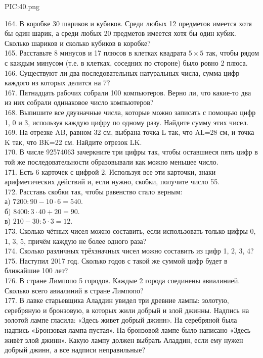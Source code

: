 \begin{center}
{{PIC:40.png}}
\end{center}
164. В коробке 30 шариков и кубиков. Среди любых 12 предметов имеется хотя бы один шарик, а среди любых 20 предметов имеется хотя бы один кубик. Сколько шариков и сколько кубиков в коробке?\\
165. Расставьте 8 минусов и 17 плюсов в клетках квадрата $5\times5$ так, чтобы рядом с каждым минусом (т.е. в клетках, соседних по стороне) было ровно 2 плюса.\\
166. Существуют ли два последовательных натуральных числа, сумма цифр каждого из которых делится на 7?\\
167. Пятнадцать рабочих собрали 100 компьютеров. Верно ли, что какие-то два из них собрали одинаковое число компьютеров?\\
168. Выпишите все двузначные числа, которые можно записать с помощью цифр 1, 0 и 3, используя каждую цифру по одному разу. Найдите сумму этих чисел.\\
169. На отрезке AB, равном 32 см, выбрана точка L так, что AL=28 см, и точка K так, что BK=22 см. Найдите отрезок LK.\\
170. В числе 92574063 зачеркните три цифры так, чтобы оставшиеся пять цифр в той же последовательности образовывали как можно меньшее число.\\
171. Есть 6 карточек с цифрой 2. Используя все эти карточки, знаки арифметических действий и, если нужно, скобки, получите число 55.\\
172. Расставь скобки так, чтобы равенство стало верным:\\
а) $7200:90-10\cdot6=540.$\\
б) $8400:3\cdot40+20=90.$\\
в) $210-30:5\cdot3=12.$\\
173. Сколько чётных чисел можно составить, если использовать только цифры 0, 1, 3, 5, причём каждую не более одного раза?\\
174. Сколько различных трёхзначных чисел можно составить из цифр 1, 2, 3, 4?\\
175. Наступил 2017 год. Сколько годов с такой же суммой цифр будет в ближайшие 100 лет?\\
176. В стране Лимпопо 5 городов. Каждые 2 города соединены авиалинией. Сколько всего авиалиний в стране Лимпопо?\\
177. В лавке старьевщика Аладдин увидел три древние лампы: золотую, серебряную и бронзовую, в которых жили добрый и злой джинны. Надпись на золотой лампе гласила: «Здесь живет добрый джинн». На серебряной была надпись «Бронзовая лампа пустая». На бронзовой лампе было написано «Здесь живёт злой джинн». Какую лампу должен выбрать Аладдин, если ему нужен добрый джинн, а все надписи неправильные?\\
